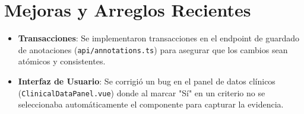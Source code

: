 \documentclass{article}
\begin{document}
\section{Mejoras y Arreglos Recientes}
\begin{itemize}
    \item \textbf{Transacciones}: Se implementaron transacciones en el endpoint de guardado de anotaciones (\texttt{api/annotations.ts}) para asegurar que los cambios sean atómicos y consistentes.
    \item \textbf{Interfaz de Usuario}: Se corrigió un bug en el panel de datos clínicos (\texttt{ClinicalDataPanel.vue}) donde al marcar "Sí" en un criterio no se seleccionaba automáticamente el componente para capturar la evidencia.
\end{itemize}
\end{document}
